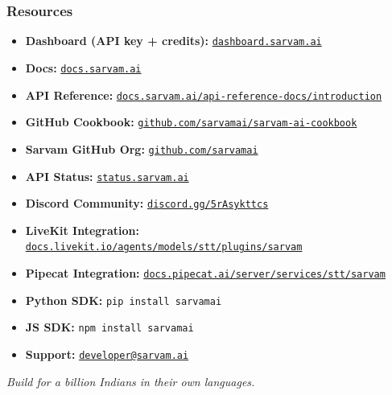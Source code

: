\begin{frame}[fragile]\frametitle{Resources}
  \begin{itemize}
    \item \textbf{Dashboard (API key + credits):} \href{https://dashboard.sarvam.ai}{\texttt{dashboard.sarvam.ai}}
    \item \textbf{Docs:} \href{https://docs.sarvam.ai}{\texttt{docs.sarvam.ai}}
    \item \textbf{API Reference:} \href{https://docs.sarvam.ai/api-reference-docs/introduction}{\texttt{docs.sarvam.ai/api-reference-docs/introduction}}
    \item \textbf{GitHub Cookbook:} \href{https://github.com/sarvamai/sarvam-ai-cookbook}{\texttt{github.com/sarvamai/sarvam-ai-cookbook}}
    \item \textbf{Sarvam GitHub Org:} \href{https://github.com/sarvamai}{\texttt{github.com/sarvamai}}
    \item \textbf{API Status:} \href{https://status.sarvam.ai}{\texttt{status.sarvam.ai}}
    \item \textbf{Discord Community:} \href{https://discord.com/invite/5rAsykttcs}{\texttt{discord.gg/5rAsykttcs}}
    \item \textbf{LiveKit Integration:} \href{https://docs.livekit.io/agents/models/stt/plugins/sarvam/}{\texttt{docs.livekit.io/agents/models/stt/plugins/sarvam}}
    \item \textbf{Pipecat Integration:} \href{https://docs.pipecat.ai/server/services/stt/sarvam}{\texttt{docs.pipecat.ai/server/services/stt/sarvam}}
    \item \textbf{Python SDK:} \lstinline|pip install sarvamai|
    \item \textbf{JS SDK:} \lstinline|npm install sarvamai|
    \item \textbf{Support:} \href{mailto:developer@sarvam.ai}{\texttt{developer@sarvam.ai}}
  \end{itemize}
\begin{center}
\textit{Build for a billion Indians in their own languages.}
\end{center}
\end{frame}
